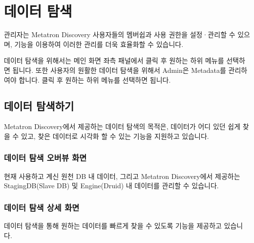 \documentclass[letterpaper,10pt,english]{sphinxmanual}
\begin{document}
\chapter{데이터 탐색}
\label{\detokenize{discovery/part09/index:id1}}\label{\detokenize{discovery/part09/index::doc}}
관리자는 Metatron Discovery 사용자들의 멤버쉽과 사용 권한을 설정·관리할 수 있으며,  기능을 이용하여 이러한 관리를 더욱 효율화할 수 있습니다.

데이터 탐색을 위해서는 메인 화면 좌측 패널에서  클릭 후 원하는 하위 메뉴를 선택하면 됩니다.
또한 사용자의 원활한 데이터 탐색을 위해서 Admin은 Metadata를 관리하여야 합니다.  클릭 후 원하는 하위 메뉴를 선택하면 됩니다.


\section{데이터 탐색하기}
\label{\detokenize{discovery/part09/dataexploration:id1}}\label{\detokenize{discovery/part09/dataexploration::doc}}
Metatron Discovery에서 제공하는 데이터 탐색의 목적은, 데이터가 어디 있던 쉽게 찾을 수 있고, 찾은 데이터로 시각화 할 수 있는 기능을 지원하고 있습니다.
\begin{quote}

\begin{figure}[H]
\centering

\noindent{}
\end{figure}
\end{quote}


\subsection{데이터 탐색 오버뷰 화면}
\label{\detokenize{discovery/part09/dataexploration:id2}}
현재 사용하고 계신 원천 DB 내 데이터, 그리고 Metatron Discovery에서 제공하는 StagingDB(Slave DB) 및 Engine(Druid) 내 데이터를 관리할 수 있습니다.
\begin{quote}

\begin{figure}[H]
\centering

\noindent{}
\end{figure}
\end{quote}


\subsection{데이터 탐색 상세 화면}
\label{\detokenize{discovery/part09/dataexploration:id3}}
데이터 탐색을 통해 원하는 데이터를 빠르게 찾을 수 있도록 기능을 제공하고 있습니다.
\begin{quote}

\begin{figure}[H]
\centering

\noindent{}
\end{figure}
\end{quote}
\end{document}
